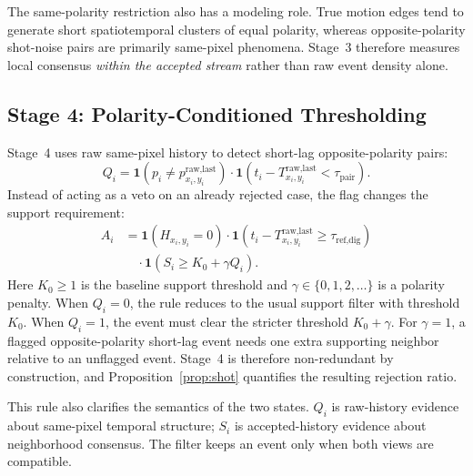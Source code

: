 \documentclass[a4paper,fleqn]{cas-dc}
\newcommand{\ind}[1]{\mathbf{1}\!\left(#1\right)}
\begin{document}
The same-polarity restriction also has a modeling role. True motion edges tend to generate short spatiotemporal clusters of equal polarity, whereas opposite-polarity shot-noise pairs are primarily same-pixel phenomena. Stage~3 therefore measures local consensus \emph{within the accepted stream} rather than raw event density alone.

\subsection{Stage 4: Polarity-Conditioned Thresholding}
\label{sec:polarity}

Stage~4 uses raw same-pixel history to detect short-lag opposite-polarity pairs:
\begin{equation}
Q_i = \ind{p_i \neq p_{x_i,y_i}^{\text{raw,last}}}\cdot\ind{t_i - T_{x_i,y_i}^{\text{raw,last}} < \tau_{\text{pair}}}.
\label{eq:polarity}
\end{equation}
Instead of acting as a veto on an already rejected case, the flag changes the support requirement:
\begin{equation}
\begin{split}
A_i &= \ind{H_{x_i,y_i}=0} \cdot \ind{t_i - T_{x_i,y_i}^{\text{raw,last}} \geq \tau_{\text{ref,dig}}} \\
&\quad \cdot \ind{S_i \geq K_0 + \gamma Q_i}.
\end{split}
\label{eq:accept}
\end{equation}
Here $K_0 \geq 1$ is the baseline support threshold and $\gamma \in \{0,1,2,\ldots\}$ is a polarity penalty. When $Q_i=0$, the rule reduces to the usual support filter with threshold $K_0$. When $Q_i=1$, the event must clear the stricter threshold $K_0+\gamma$. For $\gamma=1$, a flagged opposite-polarity short-lag event needs one extra supporting neighbor relative to an unflagged event. Stage~4 is therefore non-redundant by construction, and Proposition~\ref{prop:shot} quantifies the resulting rejection ratio.

This rule also clarifies the semantics of the two states. $Q_i$ is raw-history evidence about same-pixel temporal structure; $S_i$ is accepted-history evidence about neighborhood consensus. The filter keeps an event only when both views are compatible.
\end{document}
